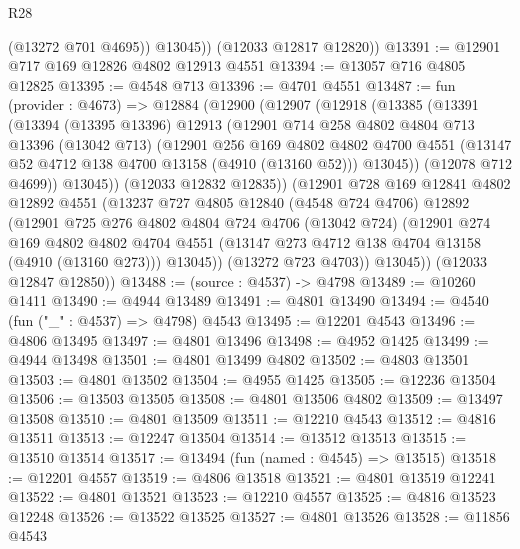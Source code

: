 \begin{lexlean}{R28}
\begin{coremodule}
            (@13272 @701 @4695))
          @13045))
      (@12033 @12817 @12820))
@13391 := @12901 @717 @169 @12826 @4802 @12913 @4551
@13394 := @13057 @716 @4805 @12825
@13395 := @4548 @713
@13396 := @4701 @4551
@13487 := fun (provider : @4673) =>
  @12884
    (@12900
      (@12907
        (@12918
          (@13385
            (@13391
              (@13394
                (@13395 @13396)
                @12913
                (@12901
                  @714
                  @258
                  @4802
                  @4804
                  @713
                  @13396
                  (@13042 @713)
                  (@12901
                    @256
                    @169
                    @4802
                    @4802
                    @4700
                    @4551
                    (@13147 @52 @4712 @138 @4700 @13158 (@4910 (@13160 @52)))
                    @13045))
                (@12078 @712 @4699))
              @13045))
          (@12033 @12832 @12835))
        (@12901
          @728
          @169
          @12841
          @4802
          @12892
          @4551
          (@13237
            @727
            @4805
            @12840
            (@4548 @724 @4706)
            @12892
            (@12901
              @725
              @276
              @4802
              @4804
              @724
              @4706
              (@13042 @724)
              (@12901
                @274
                @169
                @4802
                @4802
                @4704
                @4551
                (@13147 @273 @4712 @138 @4704 @13158 (@4910 (@13160 @273)))
                @13045))
            (@13272 @723 @4703))
          @13045))
      (@12033 @12847 @12850))
@13488 := (source : @4537) -> @4798
@13489 := @10260 @1411
@13490 := @4944 @13489
@13491 := @4801 @13490
@13494 := @4540 (fun ("_" : @4537) => @4798) @4543
@13495 := @12201 @4543
@13496 := @4806 @13495
@13497 := @4801 @13496
@13498 := @4952 @1425
@13499 := @4944 @13498
@13501 := @4801 @13499 @4802
@13502 := @4803 @13501
@13503 := @4801 @13502
@13504 := @4955 @1425
@13505 := @12236 @13504
@13506 := @13503 @13505
@13508 := @4801 @13506 @4802
@13509 := @13497 @13508
@13510 := @4801 @13509
@13511 := @12210 @4543
@13512 := @4816 @13511
@13513 := @12247 @13504
@13514 := @13512 @13513
@13515 := @13510 @13514
@13517 := @13494 (fun (named : @4545) => @13515)
@13518 := @12201 @4557
@13519 := @4806 @13518
@13521 := @4801 @13519 @12241
@13522 := @4801 @13521
@13523 := @12210 @4557
@13525 := @4816 @13523 @12248
@13526 := @13522 @13525
@13527 := @4801 @13526
@13528 := @11856 @4543

\end{coremodule}
\end{lexlean}
